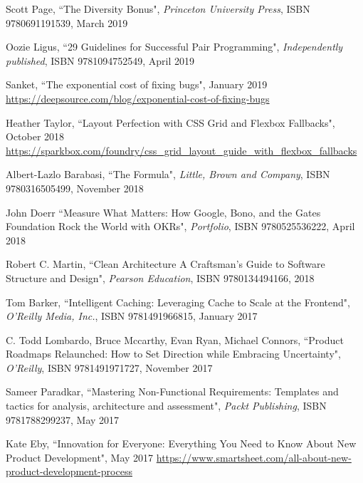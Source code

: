 \begin{thebibliography}{100}
 Scott Page, ``The Diversity Bonus", \emph{Princeton University Press}, ISBN 9780691191539, 
March 2019

 Oozie Ligus, ``29 Guidelines for Successful Pair Programming", \emph{Independently published},
ISBN 9781094752549, April 2019

 Sanket, ``The exponential cost of fixing bugs", January 2019\\
\href{https://deepsource.com/blog/exponential-cost-of-fixing-bugs}{https://deepsource.com/blog/exponential-cost-of-fixing-bugs}

 Heather Taylor, ``Layout Perfection with CSS Grid and Flexbox Fallbacks", October 2018
\href{https://sparkbox.com/foundry/css_grid_layout_guide_with_flexbox_fallbacks}{https://sparkbox.com/foundry/css\_grid\_layout\_guide\_with\_flexbox\_fallbacks}

 Albert-Lazlo Barabasi, ``The Formula", \emph{Little, Brown and Company}, ISBN 9780316505499, 
November 2018 

 John Doerr  ``Measure What Matters: How Google, Bono, and the Gates Foundation Rock the World
with OKRs", \emph{Portfolio}, ISBN 9780525536222, April 2018

 Robert C. Martin, ``Clean Architecture A Craftsman's Guide to Software Structure and 
Design", \emph{Pearson Education}, ISBN 9780134494166, 2018

 Tom Barker, ``Intelligent Caching: Leveraging Cache to Scale at the Frontend", 
\emph{O'Reilly Media, Inc.}, ISBN 9781491966815, January 2017

 C. Todd Lombardo, Bruce Mccarthy, Evan Ryan, Michael Connors, ``Product Roadmaps Relaunched: How 
to Set Direction while Embracing Uncertainty", \emph{O'Reilly}, ISBN 9781491971727, November 2017

 Sameer Paradkar, ``Mastering Non-Functional Requirements: Templates and tactics for analysis, 
architecture and assessment", \emph{Packt Publishing}, ISBN 9781788299237, May 2017

 Kate Eby, ``Innovation for Everyone: Everything You Need to Know About New Product 
Development", May 2017
\href{https://www.smartsheet.com/all-about-new-product-development-process}{https://www.smartsheet.com/all-about-new-product-development-process}


\end{thebibliography}
